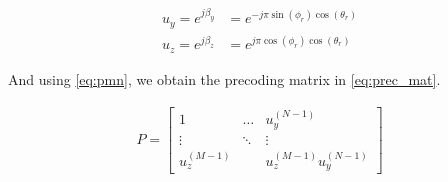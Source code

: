 \begin{comment}
\begin{align}
    u_x = e^{j \beta_x} &= e^{-j \pi \sin(\phi_0) \sin(\theta_0)} \label{eq:ux} \\
    u_y = e^{j \beta_y} &= e^{-j \pi \cos(\phi_0) \sin(\theta_0)} \label{eq:uy}
\end{align}
\end{comment}

\begin{align}
    u_y = e^{j \beta_y} &= e^{-j \pi \sin(\phi_r) \cos(\theta_r)} \label{eq:ux} \\
    u_z = e^{j \beta_z} &= e^{j \pi \cos(\phi_r) \cos(\theta_r)} \label{eq:uy}
\end{align}


And using \eqref{eq:pmn}, we obtain the precoding matrix in \eqref{eq:prec_mat}.

\begin{align} \label{eq:prec_mat}
    P = \begin{bmatrix}
        1 & \dots & u_y^{(N-1)}\\
        \vdots & \ddots & \vdots\\
        u_z^{(M-1)} &  & u_z^{(M-1)}u_y^{(N-1)}
        \end{bmatrix}
\end{align}
















